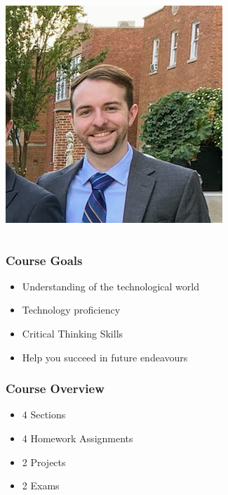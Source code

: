 \documentclass{beamer}
\begin{document}
\begin{frame}
\begin{columns}
\begin{column}{0.25\linewidth}
            \includegraphics[width=\linewidth]{prof_pic.jpg}
        \end{column}
    
    \end{columns}
\end{frame}

\begin{frame}
    \frametitle{Course Goals}
    \begin{itemize}
        \item<1-> Understanding of the technological world
        \item<2-> Technology proficiency
        \item<3-> Critical Thinking Skills
        \item<4-> Help you succeed in future endeavours 
    \end{itemize}
\end{frame}

\begin{frame}
    \frametitle{Course Overview}
    \begin{itemize}
        \item 4 Sections
        \item 4 Homework Assignments
        \item 2 Projects
        \item 2 Exams
    \end{itemize}
\end{frame}
\end{document}
